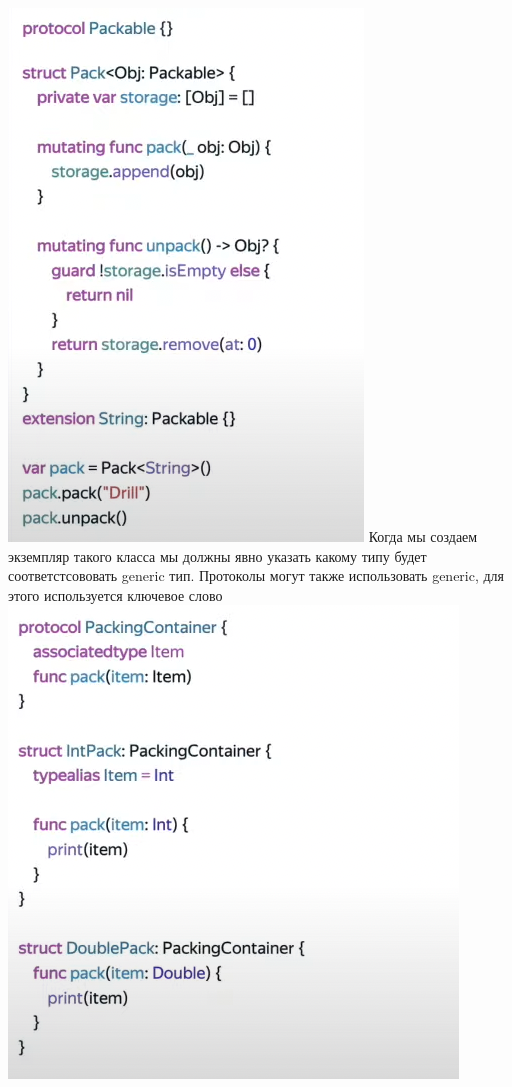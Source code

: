 \documentclass{article}
\begin{document}
    \includegraphics[scale = 0.5]{pic/Снимок экрана 2023-07-28 в 22.35.56.png}
    \newline
    Когда мы создаем экземпляр такого класса мы должны явно указать какому типу будет соответстсововать generic тип. 
    \newline
    Протоколы могут также использовать generic, для этого используется ключевое слово 
    \newline
    \includegraphics[scale = 0.5]{pic/Снимок экрана 2023-07-28 в 22.37.32.png}
\end{document}
